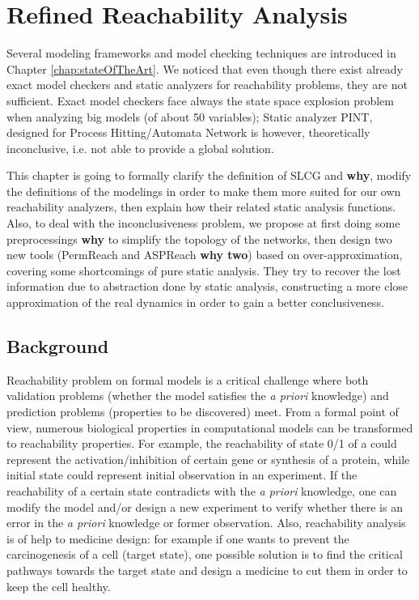 \chapter{Refined Reachability Analysis}
\begin{mybox}
Several modeling frameworks and model checking techniques are introduced in Chapter \ref{chap:stateOfTheArt}.
We noticed that even though there exist already exact model checkers and static analyzers for reachability problems, they are not sufficient.
Exact model checkers face always the state space explosion problem when analyzing big models (of about 50 variables);
Static analyzer PINT, designed for Process Hitting/Automata Network is however, theoretically inconclusive, i.e. not able to provide a global solution.

This chapter is going to formally clarify the definition of SLCG and \textbf{why}, modify the definitions of the modelings in order to make them more suited for our own reachability analyzers, then explain how their related static analysis functions.
Also, to deal with the inconclusiveness problem, we propose at first doing some preprocessings \textbf{why} to simplify the topology of the networks, then design two new tools (PermReach and ASPReach \textbf{why two}) based on over-approximation, covering some shortcomings of pure static analysis.
They try to recover the lost information due to abstraction done by static analysis, constructing a more close approximation of the real dynamics in order to gain a better conclusiveness.
\end{mybox}

\section{Background}
Reachability problem on formal models is a critical challenge where both validation problems (whether the model satisfies the \textit{a priori} knowledge) and prediction problems (properties to be discovered) meet. 
From a formal point of view, numerous biological properties in computational models can be transformed to reachability properties. 
For example, the reachability of state 0/1 of a could represent the activation/inhibition of certain gene or synthesis of a protein, while initial state could represent initial observation in an experiment.
If the reachability of a certain state contradicts with the \textit{a priori} knowledge, one can modify the model and/or design a new experiment to verify whether there is an error in the \textit{a priori} knowledge or former observation. 
Also, reachability analysis is of help to medicine design: for example if one wants to prevent the carcinogenesis of a cell (target state), one possible solution is to find the critical pathways towards the target state and design a medicine to cut them in order to keep the cell healthy.


